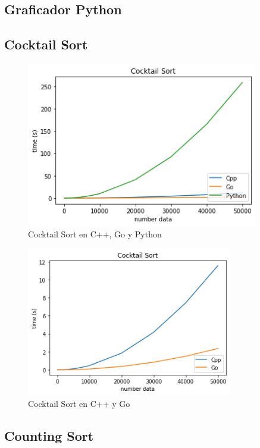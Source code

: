 \documentclass[https://www.overleaf.com/project/63761df255a8a9f4a15c3579
	letterpaper, %
	10pt, %
]{CSUniSchoolLabReport}
\begin{document}
\subsection{Graficador Python}

\subsection{Cocktail Sort}

\begin{figure}[H] 
	\centering 
	\includegraphics[width=0.9\textwidth]{Figures/cocktailSort.png} %
	\caption{Cocktail Sort en C++, Go y Python}
\end{figure}

\begin{figure}[H] 
	\centering 
	\includegraphics[width=0.8\textwidth]{Figures/cocktailSort2.png} %
	\caption{Cocktail Sort en C++ y Go}
\end{figure}


\subsection{Counting Sort}
\end{document}
